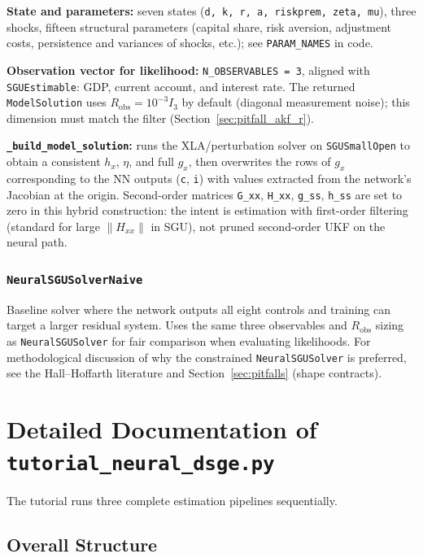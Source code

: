 \documentclass[11pt,a4paper]{article}
\theoremstyle{definition}
\newcommand{\code}[1]{\texttt{\color{codecolor}#1}}
\begin{document}
	\textbf{State and parameters:} seven states (\code{d, k, r, a, riskprem, zeta, mu}), three shocks, fifteen structural parameters (capital share, risk aversion, adjustment costs, persistence and variances of shocks, etc.); see \code{PARAM\_NAMES} in code.
	
	\textbf{Observation vector for likelihood:} \code{N\_OBSERVABLES = 3}, aligned with \code{SGUEstimable}: GDP, current account, and interest rate.
	The returned \code{ModelSolution} uses $R_{\mathrm{obs}} = 10^{-3} I_3$ by default (diagonal measurement noise); this dimension must match the filter (Section~\ref{sec:pitfall_akf_r}).
	
	\textbf{\code{\_build\_model\_solution}:} runs the XLA/perturbation solver on \code{SGUSmallOpen} to obtain a consistent $h_x$, $\eta$, and full $g_x$, then overwrites the rows of $g_x$ corresponding to the NN outputs (\code{c}, \code{i}) with values extracted from the network's Jacobian at the origin.
	Second-order matrices \code{G\_xx}, \code{H\_xx}, \code{g\_ss}, \code{h\_ss} are set to zero in this hybrid construction: the intent is estimation with first-order filtering (standard for large $\|H_{xx}\|$ in SGU), not pruned second-order UKF on the neural path.
	
	\subsubsection{\code{NeuralSGUSolverNaive}}
	
	Baseline solver where the network outputs all eight controls and training can target a larger residual system.
	Uses the same three observables and $R_{\mathrm{obs}}$ sizing as \code{NeuralSGUSolver} for fair comparison when evaluating likelihoods.
	For methodological discussion of why the constrained \code{NeuralSGUSolver} is preferred, see the Hall--Hoffarth literature and Section~\ref{sec:pitfalls} (shape contracts).
	
	
	\section{Detailed Documentation of \code{tutorial\_neural\_dsge.py}}
	\label{app:tutorial}
	
	The tutorial runs three complete estimation pipelines sequentially.
	
	\subsection{Overall Structure}
	
\end{document}
